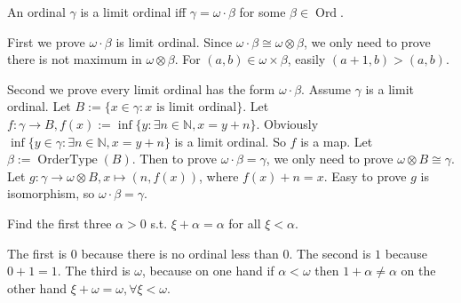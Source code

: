 \documentclass{ctexart}
\DeclareMathOperator{\ord}{Ord}
\DeclareMathOperator{\otype}{OrderType}
\newcommand{\N}{\mathbb{N}}
\begin{document}
 
 \begin{problem}
  An ordinal $\gamma$ is a limit ordinal iff $\gamma=\omega \cdot \beta$ for some $\beta \in\ord$.
 \end{problem}
 
 \begin{solution}
  First we prove $\omega\cdot \beta$ is limit ordinal. Since $\omega\cdot \beta\cong \omega\otimes \beta$, we only need to prove there is not maximum in $\omega\otimes \beta$. For $(a,b)\in \omega\times \beta$, easily $(a+1,b)>(a,b)$. 

  Second we prove every limit ordinal has the form $\omega\cdot \beta$. Assume $\gamma$ is a limit ordinal. Let $B:=\{x\in \gamma:x \text{ is limit ordinal}\}$. Let $f:\gamma\to B,f(x):=\inf\{y:\exists n\in\N,x=y+n\}$. Obviously $\inf\{y\in \gamma:\exists n\in\N,x=y+n\}$ is a limit ordinal. So $f$ is a map. Let $\beta:=\otype (B)$. Then to prove $\omega\cdot \beta=\gamma$, we only need to prove $\omega\otimes B\cong \gamma$.  Let $g:\gamma\to \omega\otimes B,x\mapsto (n,f(x))$, where $f(x)+n=x$. Easy to prove $g$ is isomorphism, so $\omega\cdot \beta=\gamma$. 
 \end{solution}
 
 
 \begin{problem}
  Find the first three $\alpha>0$ s.t. $\xi+\alpha=\alpha$ for all $\xi<\alpha$.
 \end{problem}
 
 \begin{solution}
  The first is $0$ because there is no ordinal less than $0$. The second is $1$ because $0+1=1$. The third is $\omega$, because on one hand if $\alpha<\omega$ then $1+\alpha\neq \alpha$ on the other hand $\xi+\omega=\omega,\forall \xi<\omega$. 
 \end{solution}
 
\end{document}
